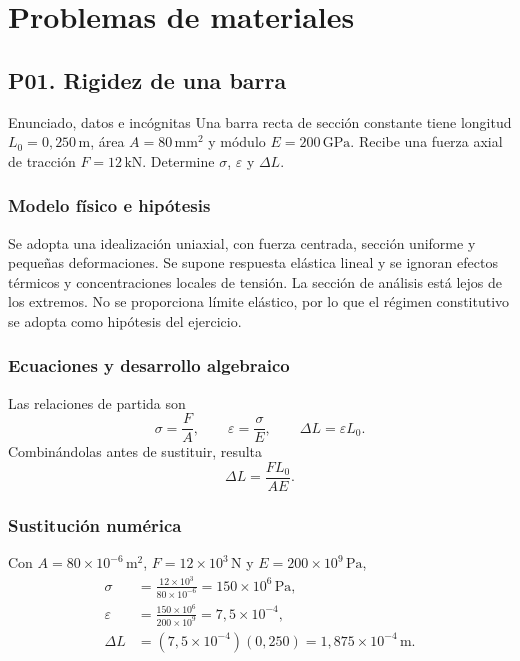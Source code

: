 
\chapter{Problemas de materiales}
\section{P01. Rigidez de una barra}
\begin{studiumworked}{Enunciado, datos e incógnitas}
Una barra recta de sección constante tiene longitud $L_0=0{,}250\,\mathrm{m}$, área $A=80\,\mathrm{mm^2}$ y módulo $E=200\,\mathrm{GPa}$. Recibe una fuerza axial de tracción $F=12\,\mathrm{kN}$. Determine $\sigma$, $\varepsilon$ y $\Delta L$.
\end{studiumworked}

\subsection{Modelo físico e hipótesis}
Se adopta una idealización uniaxial, con fuerza centrada, sección uniforme y pequeñas deformaciones. Se supone respuesta elástica lineal y se ignoran efectos térmicos y concentraciones locales de tensión. La sección de análisis está lejos de los extremos. No se proporciona límite elástico, por lo que el régimen constitutivo se adopta como hipótesis del ejercicio.

\subsection{Ecuaciones y desarrollo algebraico}
Las relaciones de partida son
\begin{equation}
\sigma=\frac{F}{A},\qquad \varepsilon=\frac{\sigma}{E},\qquad \Delta L=\varepsilon L_0.
\end{equation}
Combinándolas antes de sustituir, resulta
\begin{equation}\Delta L=\frac{FL_0}{AE}.\end{equation}

\subsection{Sustitución numérica}
Con $A=80\times10^{-6}\,\mathrm{m^2}$, $F=12\times10^3\,\mathrm{N}$ y $E=200\times10^9\,\mathrm{Pa}$,
\begin{align}
\sigma&=\frac{12\times10^3}{80\times10^{-6}}=150\times10^6\,\mathrm{Pa},\\
\varepsilon&=\frac{150\times10^6}{200\times10^9}=7{,}5\times10^{-4},\\
\Delta L&=(7{,}5\times10^{-4})(0{,}250)=1{,}875\times10^{-4}\,\mathrm{m}.
\end{align}

